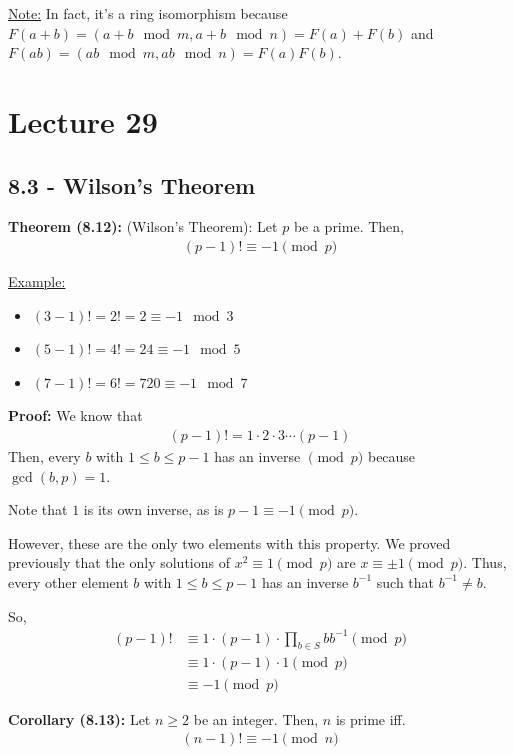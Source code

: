\documentclass{article}
\begin{document}
\underline{Note:} In fact, it's a ring isomorphism because $F(a+b)=(a+b\mod m, a+b\mod n)=F(a)+F(b)$ and $F(ab)=(ab\mod m, ab\mod n)=F(a)F(b)$. 

\section{Lecture 29}

\subsection{8.3 - Wilson's Theorem}

\textbf{Theorem (8.12):} (Wilson's Theorem): Let $p$ be a prime. Then, \begin{align*}
    (p-1)!\equiv -1\pmod p
\end{align*}

\underline{Example:} \begin{itemize}
    \item $(3-1)!=2!=2\equiv -1\mod 3$
    \item $(5-1)!=4!=24\equiv -1\mod 5$
    \item $(7-1)!=6!=720\equiv -1\mod 7$
\end{itemize}

\textbf{Proof:} We know that \begin{align*}
    (p-1)!=1\cdot 2\cdot 3\cdots (p-1)
\end{align*}
Then, every $b$ with $1\leq b\leq p-1$ has an inverse $\pmod p$ because $\gcd(b,p)=1$. 

Note that $1$ is its own inverse, as is $p-1\equiv -1\pmod p$. 

However, these are the only two elements with this property. We proved previously that the only solutions of $x^2\equiv 1\pmod p$ are $x\equiv \pm 1\pmod p$. Thus, every other element $b$ with $1\leq b\leq p-1$ has an inverse $b^{-1}$ such that $b^{-1}\neq b$. 

So, \begin{align*}
    (p-1)!&\equiv 1\cdot (p-1)\cdot \prod_{b\in S} b b^{-1}\pmod p\\
    &\equiv 1\cdot (p-1)\cdot 1\pmod p\\
    &\equiv -1\pmod p
\end{align*}

\textbf{Corollary (8.13):} Let $n\geq 2$ be an integer. Then, $n$ is prime iff. \begin{align*}
    (n-1)!\equiv -1\pmod n
\end{align*}
\end{document}
